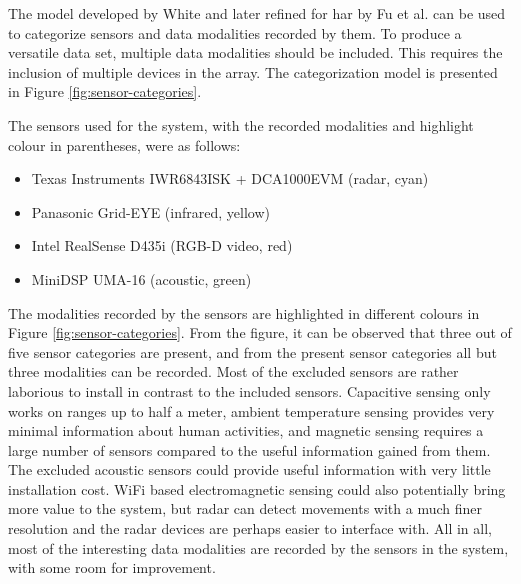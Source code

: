 The model developed by White \cite{white87} and later refined for \gls{har} by Fu et al. \cite{sensing-survey} 
can be used to categorize sensors and data modalities recorded by them.
To produce a versatile data set, 
multiple data modalities should be included.
This requires the inclusion of multiple devices in the array.
The categorization model is presented in Figure \ref{fig:sensor-categories}.

The sensors used for the system, with the recorded modalities and highlight colour in parentheses,
were as follows:
\begin{itemize}
    \item Texas Instruments IWR6843ISK + DCA1000EVM (radar, cyan)
    \item Panasonic Grid-EYE (infrared, yellow)
    \item Intel RealSense D435i (RGB-D video, red)
    \item MiniDSP UMA-16 (acoustic, green)
\end{itemize}

The modalities recorded by the sensors are highlighted in different colours in Figure \ref{fig:sensor-categories}.
From the figure, it can be observed that three out of five sensor categories are present,
and from the present sensor categories all but three modalities can be recorded.
Most of the excluded sensors are rather laborious to install in contrast to the included sensors.
Capacitive sensing only works on ranges up to half a meter,
ambient temperature sensing provides very minimal information about human activities,
and magnetic sensing requires a large number of sensors compared to the useful information gained from them.
The excluded acoustic sensors could provide useful information with very little installation cost.
WiFi based electromagnetic sensing could also potentially bring more value to the system,
but radar can detect movements with a much finer resolution and the radar devices are perhaps easier to interface with. \cite{sensing-survey}
All in all, most of the interesting data modalities are recorded by the sensors in the system,
with some room for improvement.

